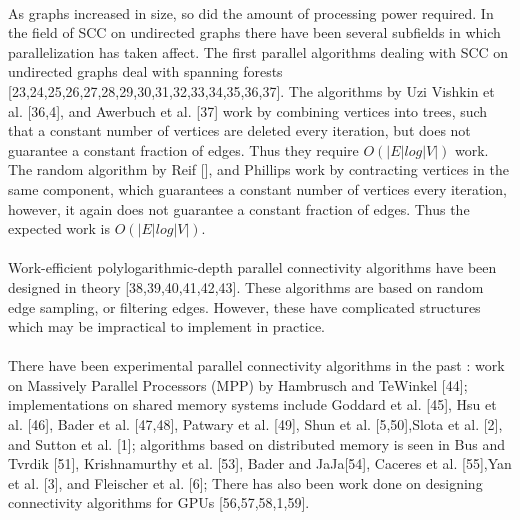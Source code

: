 \documentclass[]{article}
\begin{document}
 \paragraph{}
 As graphs increased in size, so did the amount of processing power required. In the field of SCC on undirected graphs there have been several subfields in which parallelization has taken affect.  The first parallel algorithms dealing with SCC on undirected graphs deal with spanning forests [23,24,25,26,27,28,29,30,31,32,33,34,35,36,37]. The algorithms by Uzi Vishkin et al. [36,4], and Awerbuch et al. [37] work by combining vertices into trees, such that a constant number of vertices are deleted every iteration, but does not guarantee a constant fraction of edges. Thus they require $O(|E| log |V|)$ work. The random algorithm by Reif [], and Phillips work by contracting vertices in the same component, which guarantees a constant number of vertices every iteration, however, it again does not guarantee a constant fraction of edges. Thus the expected work is $O(|E| log |V|)$.
 
 \paragraph{}
 Work-efficient polylogarithmic-depth parallel connectivity algorithms have been designed in theory [38,39,40,41,42,43]. These algorithms are based on random edge sampling, or filtering edges. However, these have complicated structures which may be impractical to implement in practice. 
 
 \paragraph{}
 There have been experimental parallel connectivity algorithms in the past : work on Massively Parallel Processors (MPP) by Hambrusch and TeWinkel [44]; implementations on shared memory systems include Goddard et al. [45], Hsu et al. [46], Bader et al. [47,48], Patwary et al. [49], Shun et al. [5,50],Slota et al. [2], and Sutton et al. [1]; algorithms based on distributed memory is seen in Bus and Tvrdik [51], Krishnamurthy et al. [53], Bader and JaJa[54], Caceres et al. [55],Yan et al. [3], and Fleischer et al. [6]; There has also been work done on designing connectivity algorithms for GPUs [56,57,58,1,59].
 
\end{document}

